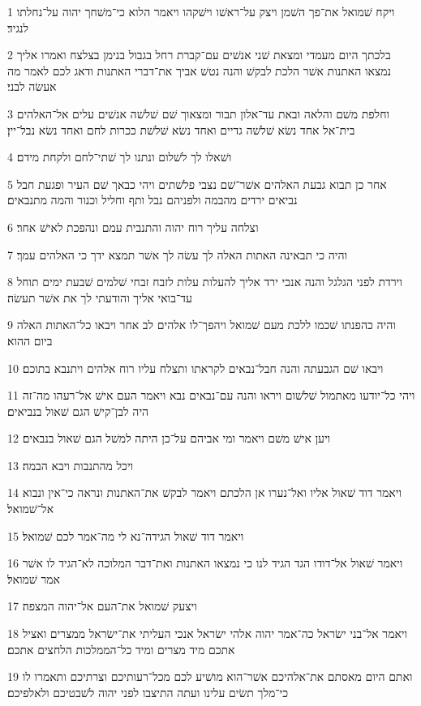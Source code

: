 \par 1 ויקח שׁמואל את־פך השׁמן ויצק על־ראשׁו וישׁקהו ויאמר הלוא כי־משׁחך יהוה על־נחלתו לנגיד׃
\par 2 בלכתך היום מעמדי ומצאת שׁני אנשׁים עם־קברת רחל בגבול בנימן בצלצח ואמרו אליך נמצאו האתנות אשׁר הלכת לבקשׁ והנה נטשׁ אביך את־דברי האתנות ודאג לכם לאמר מה אעשׂה לבני׃
\par 3 וחלפת משׁם והלאה ובאת עד־אלון תבור ומצאוך שׁם שׁלשׁה אנשׁים עלים אל־האלהים בית־אל אחד נשׂא שׁלשׁה גדיים ואחד נשׂא שׁלשׁת ככרות לחם ואחד נשׂא נבל־יין׃
\par 4 ושׁאלו לך לשׁלום ונתנו לך שׁתי־לחם ולקחת מידם׃
\par 5 אחר כן תבוא גבעת האלהים אשׁר־שׁם נצבי פלשׁתים ויהי כבאך שׁם העיר ופגעת חבל נביאים ירדים מהבמה ולפניהם נבל ותף וחליל וכנור והמה מתנבאים׃
\par 6 וצלחה עליך רוח יהוה והתנבית עמם ונהפכת לאישׁ אחר׃
\par 7 והיה כי תבאינה האתות האלה לך עשׂה לך אשׁר תמצא ידך כי האלהים עמך׃
\par 8 וירדת לפני הגלגל והנה אנכי ירד אליך להעלות עלות לזבח זבחי שׁלמים שׁבעת ימים תוחל עד־בואי אליך והודעתי לך את אשׁר תעשׂה׃
\par 9 והיה כהפנתו שׁכמו ללכת מעם שׁמואל ויהפך־לו אלהים לב אחר ויבאו כל־האתות האלה ביום ההוא׃
\par 10 ויבאו שׁם הגבעתה והנה חבל־נבאים לקראתו ותצלח עליו רוח אלהים ויתנבא בתוכם׃
\par 11 ויהי כל־יודעו מאתמול שׁלשׁום ויראו והנה עם־נבאים נבא ויאמר העם אישׁ אל־רעהו מה־זה היה לבן־קישׁ הגם שׁאול בנביאים׃
\par 12 ויען אישׁ משׁם ויאמר ומי אביהם על־כן היתה למשׁל הגם שׁאול בנבאים׃
\par 13 ויכל מהתנבות ויבא הבמה׃
\par 14 ויאמר דוד שׁאול אליו ואל־נערו אן הלכתם ויאמר לבקשׁ את־האתנות ונראה כי־אין ונבוא אל־שׁמואל׃
\par 15 ויאמר דוד שׁאול הגידה־נא לי מה־אמר לכם שׁמואל׃
\par 16 ויאמר שׁאול אל־דודו הגד הגיד לנו כי נמצאו האתנות ואת־דבר המלוכה לא־הגיד לו אשׁר אמר שׁמואל׃
\par 17 ויצעק שׁמואל את־העם אל־יהוה המצפה׃
\par 18 ויאמר אל־בני ישׂראל כה־אמר יהוה אלהי ישׂראל אנכי העליתי את־ישׂראל ממצרים ואציל אתכם מיד מצרים ומיד כל־הממלכות הלחצים אתכם׃
\par 19 ואתם היום מאסתם את־אלהיכם אשׁר־הוא מושׁיע לכם מכל־רעותיכם וצרתיכם ותאמרו לו כי־מלך תשׂים עלינו ועתה התיצבו לפני יהוה לשׁבטיכם ולאלפיכם׃
